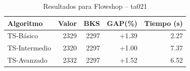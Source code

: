\begin{table}[h]
\centering
\caption{Resultados para Flowshop -- ta021}
\label{tab:flowshop_ta021}
\begin{tabular}{lrrrr}
\hline
\textbf{Algoritmo} & \textbf{Valor} & \textbf{BKS} & \textbf{GAP(\%)} & \textbf{Tiempo (s)} \\
\hline
TS-Básico & 2329 & 2297 & +1.39 & 2.27 \\
TS-Intermedio & 2320 & 2297 & +1.00 & 7.37 \\
TS-Avanzado & 2332 & 2297 & +1.52 & 6.52 \\
\hline
\end{tabular}
\end{table}
